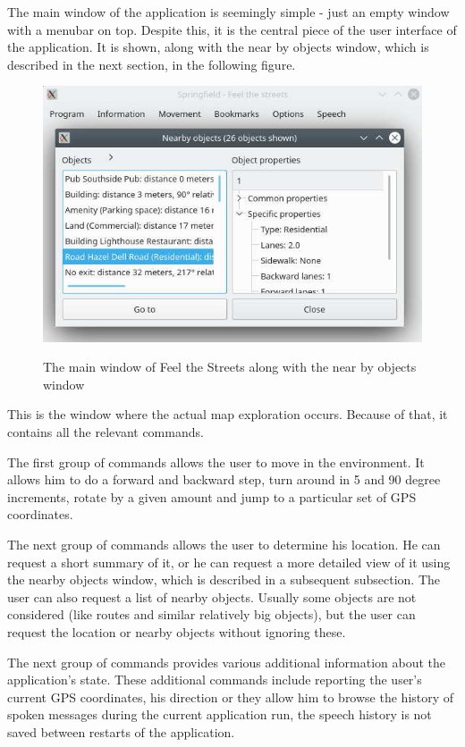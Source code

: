 \documentclass[nolof,digital]{fithesis3}
\begin{document}
The main window of the application is seemingly simple - just an empty window with a menubar on top. Despite this, it is the central piece of the user interface of the application. It is shown, along with the near by objects window, which is described in the next section, in the following figure.
\begin{figure}[h]
\caption{The main window of Feel the Streets along with the near by objects window}
\includegraphics{feel-the-streets}
\label{fig:fts}
\end{figure}

This is the window where the actual map exploration occurs. Because of that, it contains all the relevant commands.

The first group of commands allows the user to move in the environment. It allows him to do a forward and backward step, turn around in 5 and 90 degree increments, rotate by a given amount and jump to a particular set of GPS coordinates.

The next group of commands allows the user to determine his location. He can request a short summary of it, or he can request a more detailed view of it using the nearby objects window, which is described in a subsequent subsection. The user can also request a list of nearby objects. Usually some objects are not considered (like routes and similar relatively big objects), but the user can request the location or nearby objects without ignoring these.

The next group of commands provides various additional information about the application's state. These additional commands include reporting the user's current GPS coordinates, his direction or they allow him to browse the history of spoken messages during the current application run, the speech history is not saved between restarts of the application.
\end{document}
